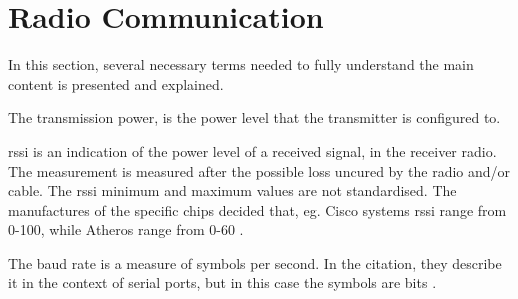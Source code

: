 \section{Radio Communication}\label{sec:radio-communication}
In this section, several necessary terms needed to fully understand the main content is presented and explained.

\begin{description}[style=nextline]
    \item[Transmission power] The transmission power, is the power level that the transmitter is configured to.
    \item[\gls{rssi}] \gls{rssi} is an indication of the power level of a received signal, in the receiver radio. The measurement is measured after the possible loss uncured by the radio and/or cable. The \gls{rssi} minimum and maximum values are not standardised. The manufactures of the specific chips decided that, eg. Cisco systems \gls{rssi} range from 0-100, while Atheros range from 0-60 \cite{website:rssi-metageek}.
    \item[Baud rate] The baud rate is a measure of symbols per second. In the citation, they describe it in the context of serial ports, but in this case the symbols are bits \cite{website:baudrate-mathworks}.
\end{description}